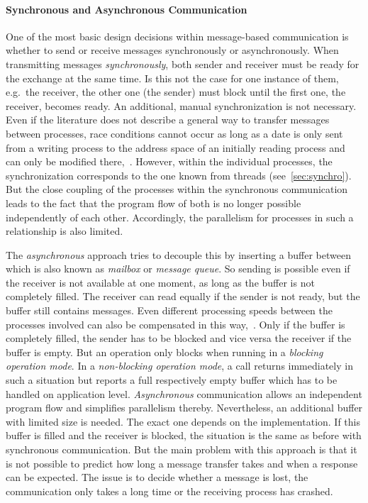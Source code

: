 \paragraph{Synchronous and Asynchronous Communication}
One of the most basic design decisions within message-based communication is whether to send or receive messages synchronously or asynchronously.
When transmitting messages \textit{synchronously}, both sender and receiver must be ready for the exchange at the same time\cite{glatz2015betriebssysteme}.
Is this not the case for one instance of them, e.g.\ the receiver, the other one (the sender) must block until the first one, the receiver, becomes ready.
An additional, manual synchronization is not necessary.
Even if the literature does not describe a general way to transfer messages between processes, race conditions cannot occur as long as a date is only sent from a writing process to the address space of an initially reading process and can only be modified there\cite{brause2017betriebssysteme},~\cite{glatz2015betriebssysteme}.
However, within the individual processes, the synchronization corresponds to the one known from threads (see~\ref{sec:synchro}).
But the close coupling of the processes within the synchronous communication leads to the fact that the program flow of both is no longer possible independently of each other.
Accordingly, the parallelism for processes in such a relationship is also limited\cite{brause2017betriebssysteme}.

The \textit{asynchronous} approach tries to decouple this by inserting a buffer between which is also known as \textit{mailbox} or \textit{message queue}.
So sending is possible even if the receiver is not available at one moment, as long as the buffer is not completely filled.
The receiver can read equally if the sender is not ready, but the buffer still contains messages.
Even different processing speeds between the processes involved can also be compensated in this way\cite{glatz2015betriebssysteme},~\cite{brause2017betriebssysteme}.
Only if the buffer is completely filled, the sender has to be blocked and vice versa the receiver if the buffer is empty.
But an operation only blocks when running in a \textit{blocking operation mode}.
In a \textit{non-blocking operation mode}, a call returns immediately in such a situation but reports a full respectively empty buffer which has to be handled on application level\cite{glatz2015betriebssysteme}.
\textit{Asynchronous} communication allows an independent program flow and simplifies parallelism thereby.
Nevertheless, an additional buffer with limited size is needed.
The exact one depends on the implementation.
If this buffer is filled and the receiver is blocked, the situation is the same as before with synchronous communication.
But the main problem with this approach is that it is not possible to predict how long a message transfer takes and when a response can be expected\cite{glatz2015betriebssysteme}.
The issue is to decide whether a message is lost, the communication only takes a long time or the receiving process has crashed\cite{tanenbaum-modern-operating-systems}.

